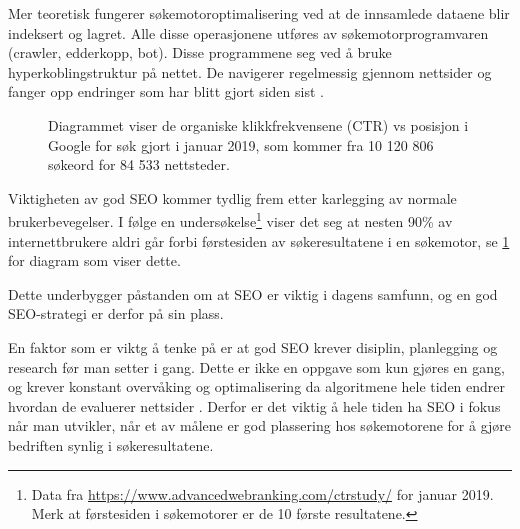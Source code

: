 Mer teoretisk fungerer søkemotoroptimalisering ved at de innsamlede dataene blir indeksert og lagret. Alle disse operasjonene utføres av søkemotorprogramvaren (crawler, edderkopp,
bot). Disse programmene  seg ved å bruke hyperkoblingstruktur på nettet. De navigerer regelmessig gjennom nettsider og fanger opp endringer som har blitt gjort siden sist  \cite[s.~488]{yalccin2010search}.

\begin{figure}[H]
    \centering
    \caption{Diagrammet viser de organiske klikkfrekvensene (CTR) vs posisjon i Google for søk gjort i januar 2019, som kommer fra 10 120 806 søkeord for 84 533 nettsteder.}
    \label{fig:analysis-awr-google-ctr}
\end{figure}

Viktigheten av god SEO kommer tydlig frem etter karlegging av normale brukerbevegelser. I følge en undersøkelse\footnote{Data fra \url{https://www.advancedwebranking.com/ctrstudy/} for januar 2019. Merk at førstesiden i søkemotorer er de 10 første resultatene.} viser det seg at nesten 90\% av internettbrukere aldri går forbi førstesiden av søkeresultatene i en søkemotor, se \ref{fig:analysis-awr-google-ctr} for diagram som viser dette.

Dette underbygger påstanden om at SEO er viktig i dagens samfunn, og en god SEO-strategi er derfor på sin plass. 

En faktor som er viktg å tenke på er at god SEO krever disiplin, planlegging og research før man setter i gang. Dette er ikke en oppgave som kun gjøres en gang, og krever konstant overvåking og optimalisering da algoritmene hele tiden endrer hvordan de evaluerer nettsider \cite[s.~1]{mitchell2012usb}. Derfor er det viktig å hele tiden ha SEO i fokus når man utvikler, når et av målene er god plassering hos søkemotorene for å gjøre bedriften synlig i søkeresultatene.

